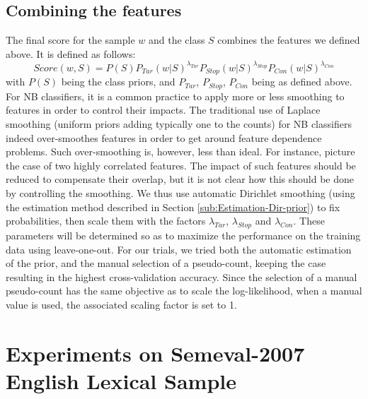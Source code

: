 \documentclass[english]{jnlp_1.4}
\begin{document}
\subsection{Combining the features}

The fi{}nal score for the sample $w$ and the class $S$ combines
the features we defined above. It is defined as follows:
\[
Score(w,S)=P(S)P_{Tar}(w|S)^{\lambda_{Tar}}P_{Stop}(w|S)^{\lambda_{Stop}}P_{Con}(w|S)^{\lambda_{Con}}
\]
with $P(S)$ being the class priors, and $P_{Tar}$, $P_{Stop}$,
$P_{Con}$ being as defined above. For NB classifiers, it is a common
practice to apply more or less smoothing to features in order to control
their impacts. The traditional use of Laplace smoothing (uniform priors
adding typically one to the counts) for NB classifi{}ers indeed over-smoothes
features in order to get around feature dependence problems. Such
over-smoothing is, however, less than ideal. For instance, picture
the case of two highly correlated features. The impact of such features
should be reduced to compensate their overlap, but it is not clear
how this should be done by controlling the smoothing. We thus use
automatic Dirichlet smoothing (using the estimation method described
in Section \ref{sub:Estimation-Dir-prior}) to fix probabilities,
then scale them with the factors $\lambda_{Tar}$, $\lambda_{Stop}$
and $\lambda_{Con}$. These parameters will be determined so as to
maximize the performance on the training data using leave-one-out.
For our trials, we tried both the automatic estimation of the prior,
and the manual selection of a pseudo-count, keeping the case resulting
in the highest cross-validation accuracy. Since the selection of a
manual pseudo-count has the same objective as to scale the log-likelihood,
when a manual value is used, the associated scaling factor is set
to 1.


\section{Experiments on Semeval-2007 English Lexical Sample}
\label{sec:Experiments-English}
\end{document}
